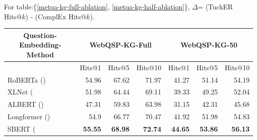 \begin{table}[]
For table:\{\ref{metqa-kg-full-ablation}, \ref{metqa-kg-half-ablation}\}, $\Delta$= (TuckER Hits@$k$) - (ComplEx Hits@$k$).
\end{table}

\begin{table}[]
\centering
\begin{tabular}{lrrrrrr}
\hline
\multicolumn{1}{c|}{\textbf{Question-Embedding-Method}} & \multicolumn{3}{c|}{\textbf{WebQSP-KG-Full}}                                                                    & \multicolumn{3}{c}{\textbf{WebQSP-KG-50}}                                                                    \\ \hline
\multicolumn{1}{c|}{}                                   & \multicolumn{1}{c|}{Hits@1}         & \multicolumn{1}{c|}{Hits@5}         & \multicolumn{1}{c|}{Hits@10}        & \multicolumn{1}{c|}{Hits@1}         & \multicolumn{1}{c|}{Hits@5}         & \multicolumn{1}{c}{Hits@10}       \\ \hline
\multicolumn{1}{l|}{RoBERTa (\citep{roberta})}                            & \multicolumn{1}{r|}{54.96}          & \multicolumn{1}{r|}{67.62}          & \multicolumn{1}{r|}{71.97}          & \multicolumn{1}{r|}{41.27}          & \multicolumn{1}{r|}{51.14}          & 54.19                             \\ \hline
\multicolumn{1}{l|}{XLNet (\citep{xlnet}}                              & \multicolumn{1}{r|}{51.98}          & \multicolumn{1}{r|}{64.44}          & \multicolumn{1}{r|}{69.11}          & \multicolumn{1}{r|}{39.33}          & \multicolumn{1}{r|}{49.25}          & 52.04                             \\ \hline
\multicolumn{1}{l|}{ALBERT (\citep{albert})}                             & \multicolumn{1}{r|}{47.31}          & \multicolumn{1}{r|}{59.83}          & \multicolumn{1}{r|}{63.98}          & \multicolumn{1}{r|}{31.15}          & \multicolumn{1}{r|}{42.31}          & 45.68                             \\ \hline
\multicolumn{1}{l|}{Longformer (\citep{beltagy2020longformer})}                         & \multicolumn{1}{r|}{54.9}           & \multicolumn{1}{r|}{66.77}          & \multicolumn{1}{r|}{70.47}          & \multicolumn{1}{r|}{41.92}          & \multicolumn{1}{r|}{51.98}          & 54.83                             \\ \hline
\multicolumn{1}{l|}{SBERT (\citep{reimers-2019-sentence-bert}}                & \multicolumn{1}{r|}{\textbf{55.55}} & \multicolumn{1}{r|}{\textbf{68.98}} & \multicolumn{1}{r|}{\textbf{72.74}} & \multicolumn{1}{r|}{\textbf{44.65}} & \multicolumn{1}{r|}{\textbf{53.86}} & \textbf{56.13}                    \\ \hline

\end{tabular}
\end{table}
